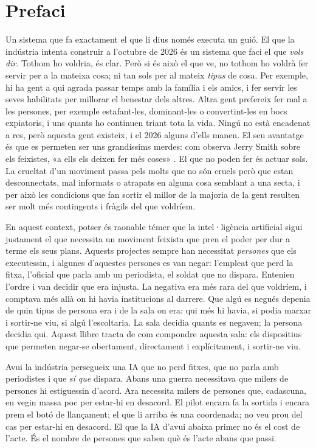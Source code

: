 \chapter*{Prefaci}
Un sistema que fa exactament el que li dius només executa un guió. El que la indústria intenta construir a l'octubre de 2026 és un sistema que faci el que \emph{vols dir}. Tothom ho voldria, és clar. Però si és això el que ve, no tothom ho voldrà fer servir per a la mateixa cosa; ni tan sols per al mateix \emph{tipus} de cosa. Per exemple, hi ha gent a qui agrada passar temps amb la família i els amics, i fer servir les seves habilitats per millorar el benestar dels altres. Altra gent prefereix fer mal a les persones, per exemple estafant-les, dominant-les o convertint-les en bocs expiatoris, i uns quants ho continuen triant tota la vida. Ningú no està encadenat a res, però aquesta gent existeix, i el 2026 alguns d'ells manen. El seu avantatge és que es permeten ser uns grandíssims merdes: com observa Jerry Smith sobre els feixistes, «a ells els deixen fer més coses» \autocite{rickandmorty2023}. El que no poden fer és actuar sols. La crueltat d'un moviment passa pels molts que no són cruels però que estan desconnectats, mal informats o atrapats en alguna cosa semblant a una secta, i per això les condicions que fan sortir el millor de la majoria de la gent resulten ser molt més contingents i fràgils del que voldríem.

En aquest context, potser és raonable témer que la intel·ligència artificial sigui justament el que necessita un moviment feixista que pren el poder per dur a terme els seus plans. Aquests projectes sempre han necessitat \emph{persones} que els executessin, i algunes d'aquestes persones es van negar: l'empleat que perd la fitxa, l'oficial que parla amb un periodista, el soldat que no dispara. Entenien l'ordre i van decidir que era injusta. La negativa era més rara del que voldríem, i comptava més allà on hi havia institucions al darrere. Que algú es negués depenia de quin tipus de persona era i de la sala on era: qui més hi havia, si podia marxar i sortir-ne viu, si algú l'escoltaria. La sala decidia quants es negaven; la persona decidia qui. Aquest llibre tracta de com compondre aquesta sala: els dispositius que permeten negar-se obertament, directament i explícitament, i sortir-ne viu.

Avui la indústria persegueix una IA que no perd fitxes, que no parla amb periodistes i que \emph{sí que} dispara. Abans una guerra necessitava que milers de persones hi estiguessin d'acord. Ara necessita milers de persones que, cadascuna, en vegin massa poc per estar-hi en desacord. El pilot encara fa la sortida i encara prem el botó de llançament; el que li arriba és una coordenada; no veu prou del cas per estar-hi en desacord. El que la IA d'avui abaixa primer no és el cost de l'acte. És el nombre de persones que saben què és l'acte abans que passi.


